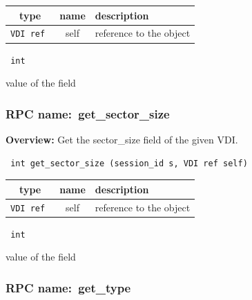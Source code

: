 
 
\vspace{0.3cm}
\begin{tabular}{|c|c|p{7cm}|}
 \hline
{\bf type} & {\bf name} & {\bf description} \\ \hline
{\tt VDI ref } & self & reference to the object \\ \hline 

\end{tabular}

\vspace{0.3cm}

{\tt 
int
}


value of the field
\vspace{0.3cm}
\vspace{0.3cm}
\vspace{0.3cm}
\subsubsection{RPC name:~get\_sector\_size}

{\bf Overview:} 
Get the sector\_size field of the given VDI.

\begin{verbatim} int get_sector_size (session_id s, VDI ref self)\end{verbatim}



 
\vspace{0.3cm}
\begin{tabular}{|c|c|p{7cm}|}
 \hline
{\bf type} & {\bf name} & {\bf description} \\ \hline
{\tt VDI ref } & self & reference to the object \\ \hline 

\end{tabular}

\vspace{0.3cm}

{\tt 
int
}


value of the field
\vspace{0.3cm}
\vspace{0.3cm}
\vspace{0.3cm}
\subsubsection{RPC name:~get\_type}

